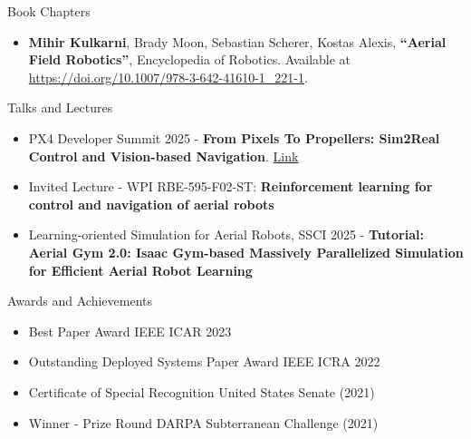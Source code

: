 \documentclass{resume} %
\begin{document}
\begin{rSection}{Book Chapters}
\begin{itemize}
    \item \textbf{Mihir Kulkarni}, Brady Moon, Sebastian Scherer, Kostas Alexis, \textbf{``Aerial Field Robotics''}, Encyclopedia of Robotics. Available at \url{https://doi.org/10.1007/978-3-642-41610-1_221-1}.

\end{itemize}
\end{rSection}


\begin{rSection}{Talks and Lectures}
\begin{itemize}
    \item PX4 Developer Summit 2025 - \textbf{From Pixels To Propellers: Sim2Real Control and Vision-based Navigation}. \href{https://www.youtube.com/watch?v=r1ws_NJmcJk}{Link}
    \item Invited Lecture - WPI RBE-595-F02-ST: \textbf{Reinforcement learning for control and navigation of aerial robots}
    \item Learning-oriented Simulation for Aerial Robots, SSCI 2025 - \textbf{Tutorial: Aerial Gym 2.0: Isaac Gym-based Massively Parallelized Simulation for Efficient Aerial Robot Learning}
\end{itemize}
    
\end{rSection}


\begin{rSection}{Awards and Achievements}
\begin{itemize}
    \item Best Paper Award \hfill  IEEE ICAR 2023
    \item Outstanding Deployed Systems Paper Award \hfill IEEE ICRA 2022
    \item Certificate of Special Recognition \hfill United States Senate (2021)
    \item Winner - Prize Round \hfill DARPA Subterranean Challenge (2021)
\end{itemize}
\end{rSection}
\end{document}
